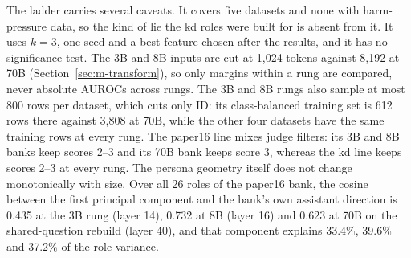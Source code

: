 The ladder carries several caveats.
It covers five datasets and none with harm-pressure data, so the kind of lie the kd roles were built for is absent from it. %
It uses $k=3$, one seed and a best feature chosen after the results, and it has no significance test. %
The 3B and 8B inputs are cut at 1{,}024 tokens against 8{,}192 at 70B (Section~\ref{sec:m-transform}), so only margins within a rung are compared, never absolute AUROCs across rungs. %
The 3B and 8B rungs also sample at most 800 rows per dataset, which cuts only ID: its class-balanced training set is 612 rows there against 3{,}808 at 70B, while the other four datasets have the same training rows at every rung. %
The paper16 line mixes judge filters: its 3B and 8B banks keep scores 2--3 and its 70B bank keeps score 3, whereas the kd line keeps scores 2--3 at every rung. %
The persona geometry itself does not change monotonically with size. %
Over all 26 roles of the paper16 bank, the cosine between the first principal component and the bank's own assistant direction is 0.435 at the 3B rung (layer 14), 0.732 at 8B (layer 16) and 0.623 at 70B on the shared-question rebuild (layer 40), and that component explains 33.4\%, 39.6\% and 37.2\% of the role variance. %

